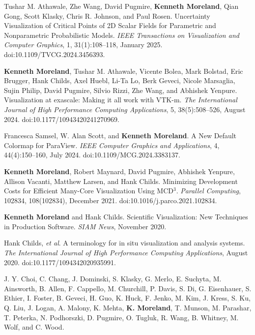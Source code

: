 \begin{enumerate}[label={[\arabic*]}, left=0pt]
\item  %
  Tushar M. Athawale, Zhe Wang, David Pugmire, \textbf{Kenneth Moreland}, Qian Gong, Scott Klasky, Chris R. Johnson, and Paul Rosen.
  Uncertainty Visualization of Critical Points of {2D} Scalar Fields for Parametric and Nonparametric Probabilistic Models.
  \emph{IEEE Transactions on Visualization and Computer Graphics}, 1, 31(1):108--118, January 2025.
  doi:10.1109/TVCG.2024.3456393.
\item  %
  \textbf{Kenneth Moreland}, Tushar M. Athawale, Vicente Bolea, Mark Bolstad, Eric Brugger, Hank Childs, Axel Huebl, Li-Ta Lo, Berk Geveci, Nicole Marsaglia, Sujin Philip, David Pugmire, Silvio Rizzi, Zhe Wang, and Abhishek Yenpure.
  {Visualization at exascale: Making it all work with VTK-m}.
  \emph{The International Journal of High Performance Computing Applications}, 5, 38(5):508--526, August 2024.
  doi:10.1177/10943420241270969.
\item  %
  Francesca Samsel, W. Alan Scott, and \textbf{Kenneth Moreland}.
  A New Default Colormap for {ParaView}.
  \emph{IEEE Computer Graphics and Applications}, 4, 44(4):150--160, July 2024.
  doi:10.1109/MCG.2024.3383137.
\item  %
  \textbf{Kenneth Moreland}, Robert Maynard, David Pugmire, Abhishek Yenpure, Allison Vacanti, Matthew Larsen, and Hank Childs.
  Minimizing Development Costs for Efficient Many-Core Visualization Using {MCD$^3$}.
  \emph{Parallel Computing}, 102834, 108(102834), December 2021.
  doi:10.1016/j.parco.2021.102834.
\item  %
  \textbf{Kenneth Moreland} and Hank Childs.
  Scientific Visualization: New Techniques in Production Software.
  \emph{SIAM News}, November 2020.
\item  %
  Hank Childs, \emph{et al}.
  A terminology for in situ visualization and analysis systems.
  \emph{The International Journal of High Performance Computing Applications}, August 2020.
  doi:10.1177/1094342020935991.
\item  %
  J. Y. Choi, C. Chang, J. Dominski, S. Klasky, G. Merlo, E. Suchyta, M. Ainsworth, B. Allen, F. Cappello, M. Churchill, P. Davis, S. Di, G. Eisenhauer, S. Ethier, I. Foster, B. Geveci, H. Guo, K. Huck, F. Jenko, M. Kim, J. Kress, S. Ku, Q. Liu, J. Logan, A. Malony, K. Mehta, \textbf{K. Moreland}, T. Munson, M. Parashar, T. Peterka, N. Podhorszki, D. Pugmire, O. Tugluk, R. Wang, B. Whitney, M. Wolf, and C. Wood.

\end{enumerate}
